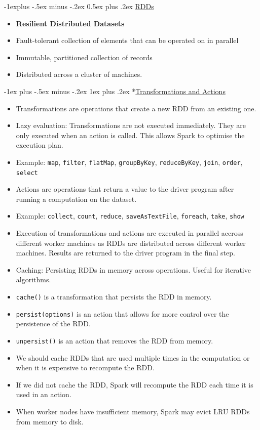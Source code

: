 \documentclass[10pt, landscape]{article}
\makeatletter
\renewcommand{\subsection}{\@startsection{subsection}{2}{0mm}%
  {-1explus -.5ex minus -.2ex}%
  {0.5ex plus .2ex}%
{\normalfont\normalsize\bfseries}}
\renewcommand{\subsubsection}{\@startsection{subsubsection}{3}{0mm}%
  {-1ex plus -.5ex minus -.2ex}%
  {1ex plus .2ex}%
{\normalfont\small\bfseries}}%
\makeatother
\begin{document}
\begin{multicols*}{4}
  \subsection{\underline{RDDs}}
  \begin{itemize}
    \item \textbf{Resilient Distributed Datasets}
    \item Fault-tolerant collection of elements that can be operated on in parallel
    \item Immutable, partitioned collection of records
    \item Distributed across a cluster of machines.
  \end{itemize}

  \subsubsection*{\underline{Transformations and Actions}}
  \begin{itemize}
    \item Transformations are operations that create a new RDD from an existing one.
    \item Lazy evaluation: Transformations are not executed immediately. They are only executed when an action is called. This allows Spark to optimise the execution plan.
    \item Example: \texttt{map}, \texttt{filter}, \texttt{flatMap}, \texttt{groupByKey}, \texttt{reduceByKey}, \texttt{join}, \texttt{order}, \texttt{select}
    \item Actions are operations that return a value to the driver program after running a computation on the dataset.
    \item Example: \texttt{collect}, \texttt{count}, \texttt{reduce}, \texttt{saveAsTextFile}, \texttt{foreach}, \texttt{take}, \texttt{show}
    \item Execution of transformations and actions are executed in parallel accross different worker machines as RDDs are distributed across different worker machines. Results are returned to the driver program in the final step.
    \item Caching: Persisting RDDs in memory across operations. Useful for iterative algorithms.
    \item \texttt{cache()} is a transformation that persists the RDD in memory.
    \item \texttt{persist(options)} is an action that allows for more control over the persistence of the RDD.
    \item \texttt{unpersist()} is an action that removes the RDD from memory.
    \item We should cache RDDs that are used multiple times in the computation or when it is expensive to recompute the RDD.
    \item If we did not cache the RDD, Spark will recompute the RDD each time it is used in an action.
    \item When worker nodes have insufficient memory, Spark may evict LRU RDDs from memory to disk.
  \end{itemize}


\end{multicols*}
\end{document}
